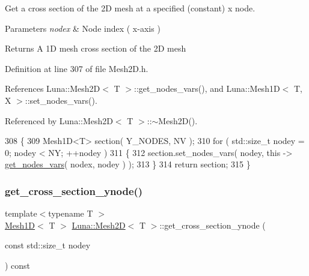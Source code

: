 Get a cross section of the 2D mesh at a specified (constant) x node. 


\begin{DoxyParams}{Parameters}
{\em nodex} & Node index ( x-\/axis ) \\
\hline
\end{DoxyParams}
\begin{DoxyReturn}{Returns}
A 1D mesh cross section of the 2D mesh 
\end{DoxyReturn}


Definition at line 307 of file Mesh2\+D.\+h.



References Luna\+::\+Mesh2\+D$<$ T $>$\+::get\+\_\+nodes\+\_\+vars(), and Luna\+::\+Mesh1\+D$<$ T, X $>$\+::set\+\_\+nodes\+\_\+vars().



Referenced by Luna\+::\+Mesh2\+D$<$ T $>$\+::$\sim$\+Mesh2\+D().


\begin{DoxyCode}
308   \{
309     Mesh1D<T> section( Y\_NODES, NV );
310     \textcolor{keywordflow}{for} ( std::size\_t nodey = 0; nodey < NY; ++nodey )
311     \{
312       section.set\_nodes\_vars( nodey, \textcolor{keyword}{this} -> \hyperlink{classLuna_1_1Mesh2D_ae91c7515960ecedf43e4ed3f411080a1}{get\_nodes\_vars}( nodex, nodey ) );
313     \}
314     \textcolor{keywordflow}{return} section;
315   \}
\end{DoxyCode}
\mbox{\label{classLuna_1_1Mesh2D_ad73c523ff66dc2d481370cd774c8e7e4}} 
\subsubsection{\texorpdfstring{get\+\_\+cross\+\_\+section\+\_\+ynode()}{get\_cross\_section\_ynode()}}
{\footnotesize\ttfamily template$<$typename T $>$ \\
\hyperlink{classLuna_1_1Mesh1D}{Mesh1D}$<$ T $>$ \hyperlink{classLuna_1_1Mesh2D}{Luna\+::\+Mesh2D}$<$ T $>$\+::get\+\_\+cross\+\_\+section\+\_\+ynode (\begin{DoxyParamCaption}\item[{const std\+::size\+\_\+t}]{nodey }\end{DoxyParamCaption}) const}



